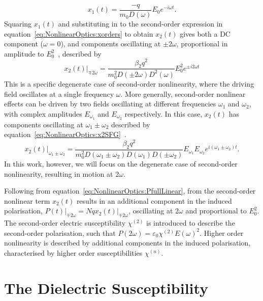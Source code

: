\begin{equation}
	x_{1}(t) = \frac{-q}{m_0 D(\omega)} E_0 e^{-i\omega t}.
\end{equation}
Squaring $x_{1}(t)$ and substituting in to the second-order expression in equation~\ref{eq:NonlinearOptics:xorders} to obtain $x_{2}(t)$ gives both a DC component ($\omega=0$), and components oscillating at $\pm 2\omega$, proportional in amplitude to $E_{0}^2$~\cite[\S 1.4.1]{Boyd2008a}, described by
\begin{equation}
	x_{2}(t)\vert_{\mp 2\omega} = \frac{\beta_2 q^2}{m_{0}^2 D(\pm 2\omega) D^{2}(\omega)} E_0^2 e^{\pm i 2\omega t}
\end{equation}
This is a specific degenerate case of second-order nonlinearity, where the driving field oscillates at a single frequency $\omega$. More generally, second-order nonlinear effects can be driven by two fields oscillating at different frequencies $\omega_1$ and $\omega_2$, with complex amplitudes $E_{\omega_1}$ and  $E_{\omega_2}$ respectively. In this case, $x_{2}(t)$ has components oscillating at $\omega_1 \pm \omega_2$ described by equation~\ref{eq:NonlinearOptics:x2SFG}~\cite[\S 1.4.1]{Boyd2008a}.
\begin{equation}\label{eq:NonlinearOptics:x2SFG}
	x_{2}(t)\vert_{\omega_1 \pm \omega_2} = \frac{\beta_2 q^2}{m_{0}^2 D(\omega_1 \pm \omega_2) D(\omega_1) D(\pm\omega_2)} E_{\omega_1} E_{\omega_2} e^{i (\omega_1 \pm \omega_2) t}.
\end{equation}
In this work, however, we will focus on the degenerate case of second-order nonlinearity, resulting in motion at $2\omega$.

Following from equation~\ref{eq:NonlinearOptics:PfullLinear}, from  the second-order nonlinear term $x_{2}(t)$ results in an additional component in the induced polarisation, $P(t)\vert_{\mp 2\omega} = N q x_{2}(t)\vert_{\mp 2\omega}$, oscillating at $2\omega$ and proportional to $E_0^2$. The second-order electric susceptibility $\chi^{(2)}$ is introduced to describe the second-order polarisation, such that $P(2\omega) = \varepsilon_0 \chi^{(2)} E(\omega)^2$. Higher order nonlinearity is described by additional components in the induced polarisation, characterised by higher order susceptibilities $\chi^{(n)}$.

\section{The Dielectric Susceptibility}\label{sec:background:NonlinearOptics:susceptibility}

